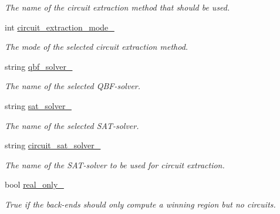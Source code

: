 \begin{DoxyCompactItemize}
\begin{DoxyCompactList}\small\item\em The name of the circuit extraction method that should be used. \end{DoxyCompactList}\item 
int \hyperlink{classOptions_a8fc8a1d275e31a687c692ebdcfcef92f}{circuit\-\_\-extraction\-\_\-mode\-\_\-}
\begin{DoxyCompactList}\small\item\em The mode of the selected circuit extraction method. \end{DoxyCompactList}\item 
string \hyperlink{classOptions_a07391a51f78315a8e8d2ecbeb8f57ddd}{qbf\-\_\-solver\-\_\-}
\begin{DoxyCompactList}\small\item\em The name of the selected Q\-B\-F-\/solver. \end{DoxyCompactList}\item 
string \hyperlink{classOptions_af68f26928f23fda3bdc75c4b43ae17bc}{sat\-\_\-solver\-\_\-}
\begin{DoxyCompactList}\small\item\em The name of the selected S\-A\-T-\/solver. \end{DoxyCompactList}\item 
string \hyperlink{classOptions_a1dc174bd99373a624a4643fd44225129}{circuit\-\_\-sat\-\_\-solver\-\_\-}
\begin{DoxyCompactList}\small\item\em The name of the S\-A\-T-\/solver to be used for circuit extraction. \end{DoxyCompactList}\item 
bool \hyperlink{classOptions_a2e3668079f6c62e087edd486d19bf84a}{real\-\_\-only\-\_\-}
\begin{DoxyCompactList}\small\item\em True if the back-\/ends should only compute a winning region but no circuits. \end{DoxyCompactList}\end{DoxyCompactItemize}
